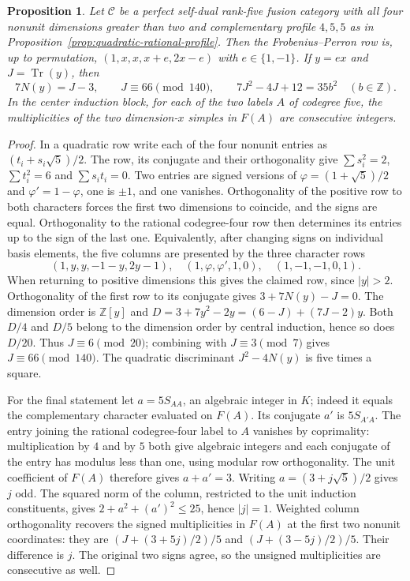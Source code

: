 \documentclass[11pt,a4paper]{article}
\newtheorem{proposition}[theorem]{Proposition}
\numberwithin{equation}{section}
\begin{document}
\begin{proposition}\label{prop:quadratic-455-line}
Let $\mathcal C$ be a perfect self-dual rank-five fusion category
with all four nonunit dimensions greater than two and complementary
profile $4,5,5$ as in Proposition~\ref{prop:quadratic-rational-profile}. Then the
Frobenius--Perron row is, up to permutation,
$(1,x,x,x+e,2x-e)$ with $e\in\{1,-1\}$. If $y=ex$ and
$J=\operatorname{Tr}(y)$, then
\[
 7N(y)=J-3,\qquad J\equiv66\pmod{140},\qquad
 7J^2-4J+12=35b^2\quad (b\in\mathbb Z).
\]
In the center induction block, for each of the two labels $A$ of
codegree five, the multiplicities of the two dimension-$x$ simples
in $F(A)$ are consecutive integers.
\end{proposition}
\begin{proof}
In a quadratic row write each of the four nonunit entries as
$(t_i+s_i\sqrt5)/2$. The row, its conjugate and their orthogonality
give $\sum s_i^2=2$, $\sum t_i^2=6$ and $\sum s_i t_i=0$.
Two entries are signed versions of $\varphi=(1+\sqrt5)/2$ and
$\varphi'=1-\varphi$, one is $\pm1$, and one vanishes. Orthogonality
of the positive row to both characters forces the first two dimensions
to coincide, and the signs are equal. Orthogonality to the rational
codegree-four row then determines its entries up to the sign of the last
one. Equivalently, after changing signs on individual basis elements,
the five columns are presented by the three character rows
\[
 (1,y,y,-1-y,2y-1),\quad (1,\varphi,\varphi',1,0),\quad
 (1,-1,-1,0,1).
\]
When returning to positive dimensions this gives the claimed row,
since $|y|>2$. Orthogonality of the first row to its conjugate gives
$3+7N(y)-J=0$. The dimension order is $\mathbb Z[y]$ and
$D=3+7y^2-2y=(6-J)+(7J-2)y$.
Both $D/4$ and $D/5$ belong to the dimension order by central
induction, hence so does $D/20$. Thus $J\equiv6\pmod{20}$;
combining with $J\equiv3\pmod7$ gives $J\equiv66\pmod{140}$.
The quadratic discriminant $J^2-4N(y)$ is five times a square.

For the final statement let $a=5S_{AA}$, an algebraic integer in $K$;
indeed it equals the complementary character evaluated on $F(A)$.
Its conjugate $a'$ is $5S_{A'A}$. The entry joining the rational
codegree-four label to $A$ vanishes by coprimality: multiplication
by $4$ and by $5$ both give algebraic integers and each conjugate of
the entry has modulus less than one, using modular row orthogonality.
The unit coefficient of $F(A)$ therefore gives $a+a'=3$.
Writing $a=(3+j\sqrt5)/2$ gives $j$ odd. The squared norm of the
column, restricted to the unit induction constituents, gives
$2+a^2+(a')^2\le25$, hence $|j|=1$.
Weighted column orthogonality recovers the signed multiplicities in
$F(A)$ at the first two nonunit coordinates: they are
$(J+(3+5j)/2)/5$ and $(J+(3-5j)/2)/5$.
Their difference is $j$. The original two signs agree, so the
unsigned multiplicities are consecutive as well.
\end{proof}
\end{document}
